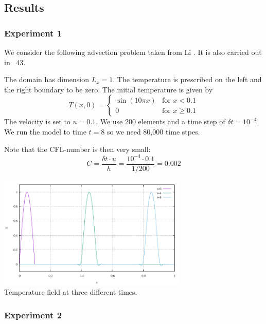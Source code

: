 \subsection*{Results}

\subsubsection*{Experiment 1}

We consider the following advection problem taken from Li \cite[ex 5.2]{li06}.
It is also carried out in \stone~43.

The domain has dimension $L_x=1$. 
The temperature is prescribed on the left and the right boundary to be zero. 
The initial temperature is given by
\[
T(x,0)=
\left\{
\begin{array}{ll}
\sin (10 \pi x) & \textrm{for } x< 0.1 \\
0               & \textrm{for } x\geq 0.1 
\end{array}
\right.
\]
The velocity is set to $u=0.1$.
We use 200 elements and a time step of $\delta t=10^{-4}$. 
We run the model to time $t=8$ so we need 80,000 time stpes. 

Note that the CFL-number is then very small: 
\[
C = \frac{\delta t \cdot u}{h} = \frac{10^{-4} \cdot  0.1}{1/200} = 0.002
\]

\begin{center}
\includegraphics[width=9cm]{python_codes/fieldstone_60/results/exp1/T.pdf}\\
{\captionfont Temperature field at three different times.}
\end{center}


\subsubsection*{Experiment 2}

